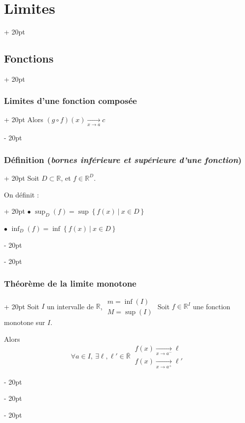 \documentclass[a4paper, 12pt, twoside]{article}
\newcommand{\R}{\mathbb{R}} %
\newcommand{\cj}[1]{\overline{#1}} %
\newcommand{\tendsto}[1]{\xrightarrow[#1]{}}
\newcommand{\set}[1]{\left\{ #1 \right\}}
\newcommand{\ind}[1][20pt]{\advance\leftskip + #1}
\newcommand{\deind}[1][20pt]{\advance\leftskip - #1}
\newenvironment{indt}[2][20pt]{#2 \par \ind[#1]}{\par \deind} %
\begin{document}
\begin{indt}{\section{Limites}}
\begin{indt}{\subsection{Fonctions}}
\begin{indt}{\subsubsection{Limites d'une fonction composée}}
                Alors $(g \circ f)(x) \tendsto{x \to a} c$
            \end{indt}

            \vspace{12pt}
            
            \begin{indt}{\subsubsection{Définition (\textit{bornes inférieure et supérieure d'une fonction})}}
                Soit $D \subset \R$, et $f \in \R^D$.

                \begin{indt}{On définit :}
                    $\bullet$ $\displaystyle \sup_D(f) = \sup\set{f(x)\ |\ x \in D}$

                    $\bullet$ $\displaystyle \inf_D(f) = \inf\set{f(x)\ |\ x \in D}$
                \end{indt}
            \end{indt}

            \vspace{12pt}
            
            \begin{indt}{\subsubsection{Théorème de la limite monotone}}
                Soit $I$ un intervalle de $\R$,
                $
                    \begin{array}{|l}
                        m = \inf(I)
                        \\
                        M = \sup(I)
                    \end{array}
                $
                Soit $f \in \R^I$ une fonction monotone sur $I$.

                \vspace{12pt}
                
                Alors
                \[
                    \forall a \in I,\ \exists \ell, \ell' \in \cj \R\
                    \begin{array}{|l}
                        f(x) \tendsto{x \to a^-} \ell
                        \\
                        f(x) \tendsto{x \to a^+} \ell'
                    \end{array}
                \]


\end{indt}
\end{indt}
\end{indt}
\end{document}
